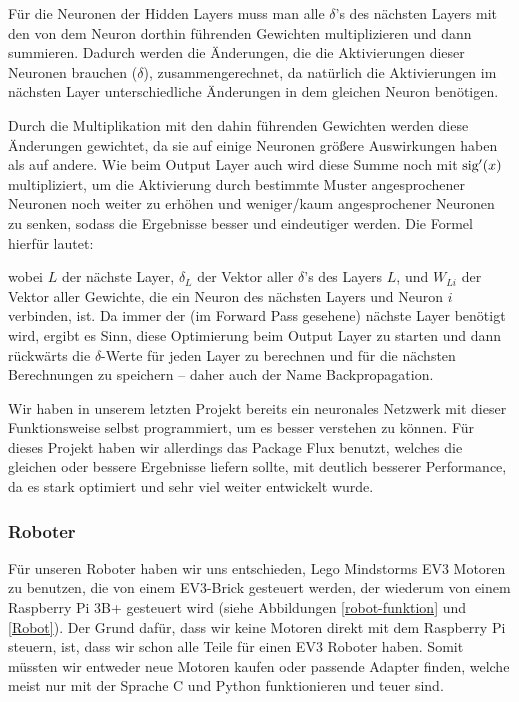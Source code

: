 \documentclass[11pt]{scrartcl}
\begin{document}
	Für die Neuronen der Hidden Layers muss man alle $\delta$'s des nächsten Layers mit den von dem Neuron dorthin führenden Gewichten multiplizieren und dann summieren. Dadurch werden die Änderungen, die die Aktivierungen dieser Neuronen brauchen ($\delta$), zusammengerechnet, da natürlich die Aktivierungen im nächsten Layer unterschiedliche Änderungen in dem gleichen Neuron benötigen.
	
	Durch die Multiplikation mit den dahin führenden Gewichten werden diese Änderungen gewichtet, da sie auf einige Neuronen größere Auswirkungen haben als auf andere. Wie beim Output Layer auch wird diese Summe noch mit $\textrm{sig}'(x)$ multipliziert, um die Aktivierung durch bestimmte Muster angesprochener Neuronen noch weiter zu erhöhen und weniger/kaum angesprochener Neuronen zu senken, sodass die Ergebnisse besser und eindeutiger werden. Die Formel hierfür lautet:

%
	\noindent wobei $L$ der nächste Layer, $\delta_L$ der Vektor aller $\delta$'s des Layers $L$, und $W_{Li}$ der Vektor aller Gewichte, die ein Neuron des nächsten Layers und Neuron $i$ verbinden, ist.
%
	Da immer der (im Forward Pass gesehene) nächste Layer benötigt wird, ergibt es Sinn, diese Optimierung beim Output Layer zu starten und dann rückwärts die \mbox{$\delta$-Werte} für jeden Layer zu berechnen und für die nächsten Berechnungen zu speichern -- daher auch der Name Backpropagation. \cite{MITNeuronale} \cite{3b1b:nn} \cite{brotcrunsher:backwardpass}


	Wir haben in unserem letzten Projekt bereits ein neuronales Netzwerk mit dieser Funktionsweise selbst programmiert, um es besser verstehen zu können. \cite{AIComposer} Für dieses Projekt haben wir allerdings das Package Flux benutzt, welches die gleichen oder bessere Ergebnisse liefern sollte, mit deutlich besserer Performance, da es stark optimiert und sehr viel weiter entwickelt wurde. \cite{Flux.jl-2018}

	\subsubsection{Roboter}

	Für unseren Roboter haben wir uns entschieden, Lego Mindstorms EV3 Motoren zu benutzen, die von einem EV3-Brick gesteuert werden, der wiederum von einem Raspberry Pi 3B+ gesteuert wird (siehe Abbildungen \ref{robot-funktion} und \ref{Robot}). Der Grund dafür, dass wir keine Motoren direkt mit dem Raspberry Pi steuern, ist, dass wir schon alle Teile für einen EV3 Roboter haben. Somit müssten wir entweder neue Motoren kaufen oder passende Adapter finden, welche meist nur mit der Sprache C und Python funktionieren und teuer sind.
\end{document}
